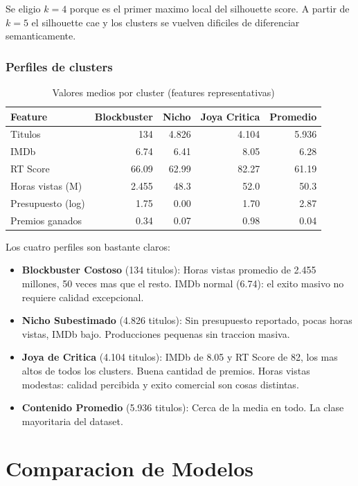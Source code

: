 \documentclass[12pt, a4paper]{article}
\begin{document}
Se eligio $k=4$ porque es el primer maximo local del silhouette score. A partir de $k=5$ el silhouette cae y los clusters se vuelven dificiles de diferenciar semanticamente.

\subsubsection{Perfiles de clusters}

\begin{table}[H]
\centering
\caption{Valores medios por cluster (features representativas)}
\begin{tabular}{lrrrr}
\toprule
\textbf{Feature} & \textbf{Blockbuster} & \textbf{Nicho} & \textbf{Joya Critica} & \textbf{Promedio} \\
\midrule
Titulos             &    134 & 4.826 & 4.104 & 5.936 \\
IMDb                &   6.74 &  6.41 &  8.05 &  6.28 \\
RT Score            &  66.09 & 62.99 & 82.27 & 61.19 \\
Horas vistas (M)    & 2.455  &  48.3 &  52.0 &  50.3 \\
Presupuesto (log)   &   1.75 &  0.00 &  1.70 &  2.87 \\
Premios ganados     &   0.34 &  0.07 &  0.98 &  0.04 \\
\bottomrule
\end{tabular}
\end{table}

Los cuatro perfiles son bastante claros:
\begin{itemize}
\item \textbf{Blockbuster Costoso} (134 titulos): Horas vistas promedio de 2.455 millones, 50 veces mas que el resto. IMDb normal (6.74): el exito masivo no requiere calidad excepcional.
\item \textbf{Nicho Subestimado} (4.826 titulos): Sin presupuesto reportado, pocas horas vistas, IMDb bajo. Producciones pequenas sin traccion masiva.
\item \textbf{Joya de Critica} (4.104 titulos): IMDb de 8.05 y RT Score de 82, los mas altos de todos los clusters. Buena cantidad de premios. Horas vistas modestas: calidad percibida y exito comercial son cosas distintas.
\item \textbf{Contenido Promedio} (5.936 titulos): Cerca de la media en todo. La clase mayoritaria del dataset.
\end{itemize}

\section{Comparacion de Modelos}
\end{document}
